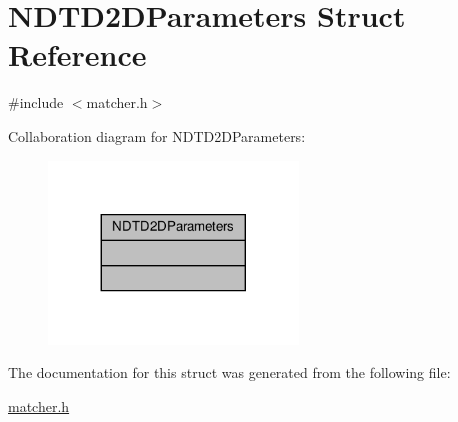 \hypertarget{structNDTD2DParameters}{}\section{N\+D\+T\+D2\+D\+Parameters Struct Reference}
\label{structNDTD2DParameters}


{\ttfamily \#include $<$matcher.\+h$>$}



Collaboration diagram for N\+D\+T\+D2\+D\+Parameters\+:\nopagebreak
\begin{figure}[H]
\begin{center}
\leavevmode
\includegraphics[width=188pt]{d5/d0a/structNDTD2DParameters__coll__graph}
\end{center}
\end{figure}


The documentation for this struct was generated from the following file\+:\begin{DoxyCompactItemize}
\item 
\hyperlink{matcher_8h}{matcher.\+h}\end{DoxyCompactItemize}
